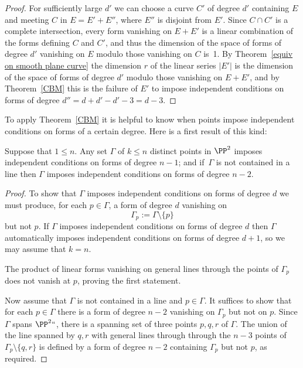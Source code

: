 \begin{proof}
For sufficiently large $d'$ we can choose a curve $C'$ of degree $d'$ containing
$E$ and meeting $C$ in $E = E'+E''$, where $E''$ is disjoint from $E'$. Since $C\cap C'$
is a complete intersection, every form vanishing on $E+E'$ is a linear combination of
the forms defining $C$ and $C'$, and thus the dimension of the space of forms of degree $d'$
vanishing on $E$ modulo those vanishing on $C$ is~1. By
Theorem~\ref{equiv on smooth plane curve} the dimension $r$ of the
linear series $|E'|$ is the dimension of the space of
forms of degree $d'$ modulo those vanishing on $E+E'$, and by Theorem~\ref{CBM} this
is the failure of $E'$ to impose independent conditions on forms of degree
$d'' = d+d' - d' -3 = d-3$.
\unif
\end{proof}

To apply Theorem~\ref{CBM} it is helpful to know when points impose independent conditions on forms of a certain degree. Here is a first result of this kind:
%

\begin{proposition}\label{n-2 independence}
Suppose that $1\leq n$. Any set $\Gamma$ of $k\leq n$ distinct points
in $\PP^{2}$ imposes independent conditions on forms of degree $n-1$;
and if $\,\Gamma$ is not contained in a line then $\Gamma$ imposes
independent conditions on forms of degree $n-2$.
\unif
\end{proposition}

\begin{proof} To show that $\Gamma$ imposes independent conditions on forms of degree $d$ we must produce, for each $p\in \Gamma$, a form of degree $d$ vanishing on 
$$
\Gamma_{p}:=\Gamma\setminus\{p\}
$$
 but not $p$. If $\Gamma$ imposes independent conditions on forms of degree $d$ then
 $\Gamma$ automatically imposes independent conditions on forms of degree $d+1$,
 so we may assume that $k=n$.
 
The product of linear forms
 vanishing on general lines through the points of $\Gamma_{p}$ does not vanish at $p$, proving the first statement.

Now assume that $\Gamma$ is not contained in a line and $p\in \Gamma$. It suffices to show that for each $p\in \Gamma$ there is a form of degree $n-2$ vanishing on $\Gamma_{p}$ but not on $p$. Since $\Gamma$ spans $\PP^2` `$, there is a spanning set of three points $p,q,r$ of $\Gamma$. The union of the line spanned by $q,r$ with general lines through 
through the $n-3$ points of $\Gamma_{p}\setminus\{q,r\}$ is defined by a form of degree $n-2$ containing $\Gamma_{p}$ but not $p$, 
as required. 
\end{proof}

